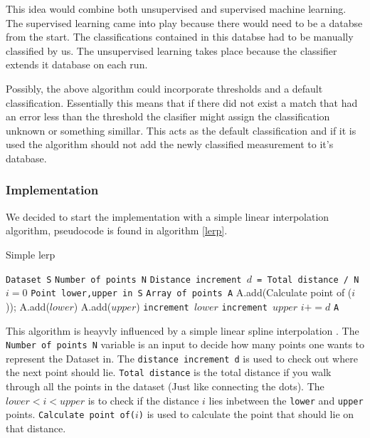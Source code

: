 \documentclass[a4paper, 10pt, conference]{ieeeconf}      %
\begin{document}
This idea would combine both unsupervised and supervised machine learning. The supervised learning came into play because there would need to be a databse from the start. The classifications contained in this databse had to be manually classified by us. The unsupervised learning takes place because the classifier extends it database on each run.

Possibly, the above algorithm could incorporate thresholds and a default classification. Essentially this means that if there did not exist a match that had an error less than the threshold the clasifier might assign the classification unknown or something simillar. This acts as the default classification and if it is used the algorithm should not add the newly classified measurement to it's database.

\subsubsection{Implementation}
We decided to start the implementation with a simple linear interpolation algorithm, pseudocode is found in algorithm \ref{lerp}.

\begin{algorithm}
  \caption{\label{lerp}Simple lerp}
  \begin{algorithmic}[1]
      \State \texttt{Dataset S}
      \State \texttt{Number of points N}
      \State \texttt{Distance increment $d$ = Total distance / N}
      \State \texttt{$i = 0$}
      \State \texttt{Point lower,upper in S}
      \State \texttt{Array of points A}
      		\State A.add(Calculate point of ($i$));
      		\State A.add($lower$)
      		\State A.add($upper$)
      	\Else
      			\State \texttt{increment $lower$}
      			\State \texttt{increment $upper$}
      		\EndWhile
      	\EndIf
      	\State \texttt{$i += d$}
      \EndWhile
      \Return \texttt{A}
  \end{algorithmic}
\end{algorithm}

This algorithm is heayvly influenced by a simple linear spline interpolation \cite{interpolation}. The \texttt{Number of points N} variable is an input to decide how many points one wants to represent the Dataset in. The \texttt{distance increment d} is used to check out where the next point should lie. \texttt{Total distance} is the total distance if you walk through all the points in the dataset (Just like connecting the dots). The \texttt{$lower < i < upper$} is to check if the distance $i$ lies inbetween the \texttt{lower} and \texttt{upper} points. \texttt{Calculate point of($i$)} is used to calculate the point that should lie on that distance.
\end{document}
